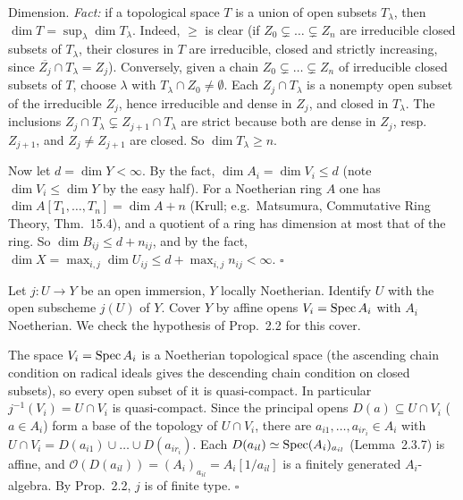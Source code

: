 \documentclass[11pt]{article}
\begin{document}
Dimension. \emph{Fact:} if a topological space $T$ is a union of open subsets $T_\lambda$, then $\dim T=\sup_\lambda\dim T_\lambda$. Indeed, $\ge$ is clear (if $Z_0\subsetneq\dots\subsetneq Z_n$ are irreducible closed subsets of $T_\lambda$, their closures in $T$ are irreducible, closed and strictly increasing, since $\overline{Z_j}\cap T_\lambda=Z_j$). Conversely, given a chain $Z_0\subsetneq\dots\subsetneq Z_n$ of irreducible closed subsets of $T$, choose $\lambda$ with $T_\lambda\cap Z_0\neq\emptyset$. Each $Z_j\cap T_\lambda$ is a nonempty open subset of the irreducible $Z_j$, hence irreducible and dense in $Z_j$, and closed in $T_\lambda$. The inclusions $Z_j\cap T_\lambda\subsetneq Z_{j+1}\cap T_\lambda$ are strict because both are dense in $Z_j$, resp.\ $Z_{j+1}$, and $Z_j\ne Z_{j+1}$ are closed. So $\dim T_\lambda\ge n$.

Now let $d=\dim Y<\infty$. By the fact, $\dim A_i=\dim V_i\le d$ (note $\dim V_i\le \dim Y$ by the easy half). For a Noetherian ring $A$ one has $\dim A[T_1,\dots,T_n]=\dim A+n$ (Krull; e.g.\ Matsumura, Commutative Ring Theory, Thm.~15.4), and a quotient of a ring has dimension at most that of the ring. So $\dim B_{ij}\le d+n_{ij}$, and by the fact, $\dim X=\max_{i,j}\dim U_{ij}\le d+\max_{i,j}n_{ij}<\infty$. \hfill$\square$

\pf
Let $j:U\to Y$ be an open immersion, $Y$ locally Noetherian. Identify $U$ with the open subscheme $j(U)$ of $Y$. Cover $Y$ by affine opens $V_i=\operatorname{Spec} A_i$ with $A_i$ Noetherian. We check the hypothesis of Prop.~2.2 for this cover.

The space $V_i=\operatorname{Spec} A_i$ is a Noetherian topological space (the ascending chain condition on radical ideals gives the descending chain condition on closed subsets), so every open subset of it is quasi-compact. In particular $j^{-1}(V_i)=U\cap V_i$ is quasi-compact. Since the principal opens $D(a)\subseteq U\cap V_i$ ($a\in A_i$) form a base of the topology of $U\cap V_i$, there are $a_{i1},\dots,a_{ir_i}\in A_i$ with $U\cap V_i=D(a_{i1})\cup\dots\cup D(a_{ir_i})$. Each $D(a_{il})\simeq\operatorname{Spec} (A_i)_{a_{il}}$ (Lemma~2.3.7) is affine, and $\mathcal O(D(a_{il}))=(A_i)_{a_{il}}=A_i[1/a_{il}]$ is a finitely generated $A_i$-algebra. By Prop.~2.2, $j$ is of finite type. \hfill$\square$
\end{document}
